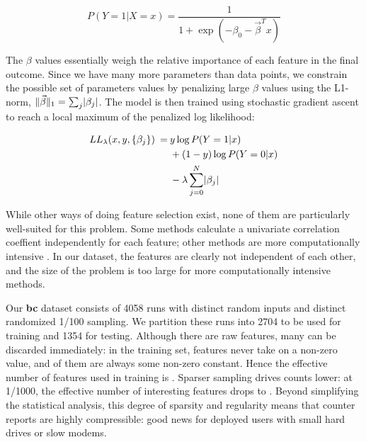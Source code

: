 \begin{equation*}
  P(Y = 1 | X = x) = \frac{1}{ 1 + \exp(- \beta_0 - \vec\beta^T x) }
\end{equation*}

The $\beta$ values essentially weigh the relative importance of each
feature in the final outcome.  Since we have many more parameters than
data points, we constrain the possible set of parameters values by
penalizing large $\beta$ values using the L1-norm, $\lVert\vec\beta\rVert_1
= \sum_j \lvert\beta_j\rvert$.  The model is then trained using stochastic
gradient ascent to reach a local maximum of the penalized log
likelihood:

\begin{equation*}
  \begin{split}
    LL_\lambda (x, y, \{\beta_j\}) \:=\:
    & y \log P(Y = 1 | x) \\
    & + (1 - y) \log P(Y = 0 | x) \\
    & - \lambda \sum_{j = 0}^N \lvert\beta_j\rvert
  \end{split}
\end{equation*}

While other ways of doing feature selection exist, none of them are
particularly well-suited for this problem.  Some methods
calculate a univariate correlation coeffient independently for each
feature; other methods are more computationally intensive
.  In our dataset, the
features are clearly not independent of each other, and the size of
the problem is too large for more computationally intensive methods.

Our \textbf{bc} dataset consists of 4058 runs with distinct random
inputs and distinct randomized 1/100 sampling.  We partition these
runs into 2704 to be used for training and 1354 for testing.  Although
there are \unknown raw features, many can be discarded immediately: in
the training set, \unknown features never take on a non-zero value,
and \unknown of them are always some non-zero constant.  Hence the
effective number of features used in training is \unknown.  Sparser
sampling drives counts lower: at 1/1000, the effective number of
interesting features drops to \unknown.  Beyond simplifying the
statistical analysis, this degree of sparsity and regularity means
that counter reports are highly compressible: good news for deployed
users with small hard drives or slow modems.

